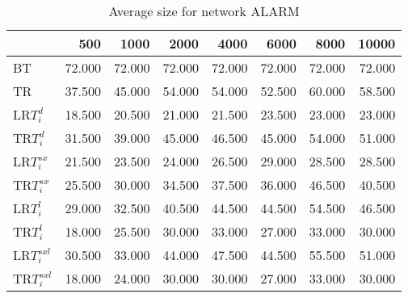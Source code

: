 \begin{table}
\begin{center}
\begin{tabular}{lrrrrrrr}
 & 500 & 1000 & 2000 & 4000 & 6000 & 8000 & 10000\\\hline
BT & 72.000 & 72.000 & 72.000 & 72.000 & 72.000 & 72.000 & 72.000\\\hline
TR & 37.500 & 45.000 & 54.000 & 54.000 & 52.500 & 60.000 & 58.500\\\hline
LR$T_i^d$ & 18.500 & 20.500 & 21.000 & 21.500 & 23.500 & 23.000 & 23.000\\\hline
TR$T_i^d$ & 31.500 & 39.000 & 45.000 & 46.500 & 45.000 & 54.000 & 51.000\\\hline
LR$T_i^{sx}$ & 21.500 & 23.500 & 24.000 & 26.500 & 29.000 & 28.500 & 28.500\\\hline
TR$T_i^{sx}$ & 25.500 & 30.000 & 34.500 & 37.500 & 36.000 & 46.500 & 40.500\\\hline
LR$T_i^l$ & 29.000 & 32.500 & 40.500 & 44.500 & 44.500 & 54.500 & 46.500\\\hline
TR$T_i^l$ & 18.000 & 25.500 & 30.000 & 33.000 & 27.000 & 33.000 & 30.000\\\hline
LR$T_i^{sxl}$ & 30.500 & 33.000 & 44.000 & 47.500 & 44.500 & 55.500 & 51.000\\\hline
TR$T_i^{sxl}$ & 18.000 & 24.000 & 30.000 & 30.000 & 27.000 & 33.000 & 30.000\\\hline
\end{tabular}
\end{center}
\caption{Average size for network ALARM }
\label{Alarmsi}
\end{table}

